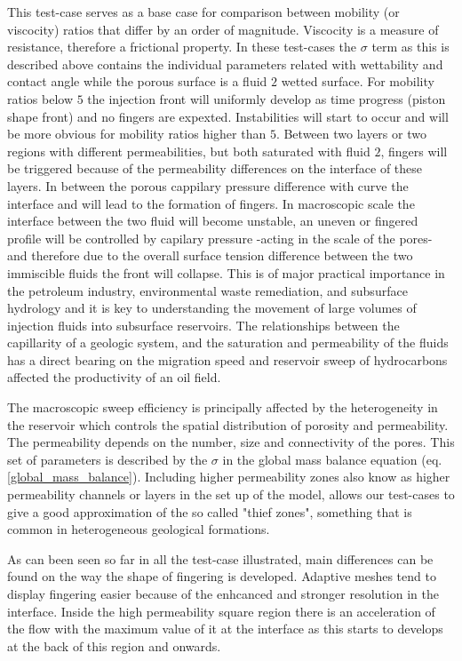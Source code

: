 \documentclass[preprint,authoryear,12pt]{elsarticle}
\begin{document}
\medskip
This test-case serves as a base case for comparison between mobility (or viscocity) ratios that differ by an order of magnitude. Viscocity is a measure of resistance, therefore a frictional property. In these test-cases the $\sigma$ term as this is described above contains the individual parameters related with wettability and contact angle while the porous surface is a fluid $2$ wetted surface. For mobility ratios below $5$ the injection front will uniformly develop as time progress (piston shape front) and no fingers are expexted. Instabilities will start to occur and will be more obvious for mobility ratios higher than $5$. Between two layers or two regions with different permeabilities, but both saturated with fluid $2$, fingers will be triggered because of the permeability differences on the interface of these layers. In between the porous cappilary pressure difference with curve the interface and will lead to the formation of fingers. In macroscopic scale the interface between the two fluid will become unstable, an uneven or fingered profile will be controlled by capilary pressure -acting in the scale of the pores- and therefore due to the overall surface tension difference between the two immiscible fluids the front will collapse. This is of major practical importance in the petroleum industry, environmental waste remediation, and subsurface hydrology and it is key to understanding the movement of large volumes of injection fluids into subsurface reservoirs. The relationships between the capillarity of a geologic system, and the saturation and permeability of the fluids has a direct bearing on the migration speed and reservoir sweep of hydrocarbons affected the productivity of an oil field.

\medskip
The macroscopic sweep efficiency is principally affected by the heterogeneity in the reservoir which controls the spatial distribution of porosity and permeability. The permeability depends on the number, size and connectivity of the pores. This set of parameters is described by the $\sigma$ in the global mass balance equation (eq.\ref{global_mass_balance}). Including higher permeability zones also know as higher permeability channels or layers in the set up of the model, allows our test-cases to give a good approximation of the so called "thief zones", something that is common in heterogeneous geological formations.

\medskip 
As can been seen so far in all the test-case illustrated, main differences can be found on the way the shape of fingering is developed. Adaptive meshes tend to display fingering easier because of the enhcanced and stronger resolution in the interface. Inside the high permeability square region there is an acceleration of the flow with the maximum value of it at the interface as this starts to develops at the back of this region and onwards. %
\end{document}
